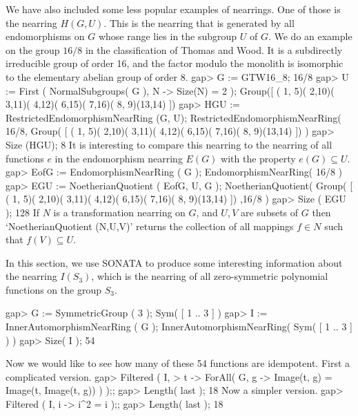 We have also included some less popular examples of nearrings.
One of those is the nearring $H (G, U)$. This is the nearring
that is generated by all endomorphisms on $G$ whose range lies in
the subgroup $U$ of $G$.
We do an example on the group $16/8$ in the classification of
Thomas and Wood. It is a subdirectly irreducible group of order 16,
and the factor modulo the monolith is isomorphic to the elementary abelian group
of order 8.
\beginexample
    gap> G := GTW16_8;
    16/8
    gap> U := First ( NormalSubgroups( G ), N -> Size(N) = 2 );
    Group([ ( 1, 5)( 2,10)( 3,11)( 4,12)( 6,15)( 7,16)( 8, 9)(13,14) ])
    gap> HGU := RestrictedEndomorphismNearRing (G, U);
    RestrictedEndomorphismNearRing( 16/8, Group(
    [ ( 1, 5)( 2,10)( 3,11)( 4,12)( 6,15)( 7,16)( 8, 9)(13,14) ]) )
    gap> Size (HGU);
    8
\endexample
It is interesting to compare this nearring to the nearring of
all functions $e$ in the endomorphism nearring $E (G)$ with the
property $e (G) \subseteq U$.
\beginexample
    gap> EofG := EndomorphismNearRing ( G );
    EndomorphismNearRing( 16/8 )
    gap> EGU := NoetherianQuotient ( EofG, U, G );
    NoetherianQuotient( Group(
    [ ( 1, 5)( 2,10)( 3,11)( 4,12)( 6,15)( 7,16)( 8, 9)(13,14) ]) ,16/8 )
    gap> Size ( EGU );
    128
\endexample
If $N$ is a transformation nearring on $G$, and $U, V$ are subsets of $G$ then
`NoetherianQuotient (N,U,V)' returns the collection of all mappings
$f \in N$ such that $f(V) \subseteq U$.



In this section, we use SONATA to produce some interesting information
about the nearring $I(S_3)$, which is the nearring of all zero-symmetric polynomial
functions on the group $S_3$. 
 
\beginexample 
    gap> G := SymmetricGroup ( 3 );
    Sym( [ 1 .. 3 ] )
    gap> I := InnerAutomorphismNearRing ( G );
    InnerAutomorphismNearRing( Sym( [ 1 .. 3 ] ) )
    gap> Size( I );
    54
\endexample

Now we would like to see how many of these 54 functions are idempotent.
First a complicated version.
\beginexample
    gap> Filtered ( I,
    >       t -> ForAll( G, g -> Image(t, g) = Image(t, Image(t, g)) ) );;
    gap> Length( last );
    18
\endexample
Now a simpler version.
\beginexample
    gap> Filtered ( I, i -> i^2 = i );;
    gap> Length( last );
    18
\endexample



